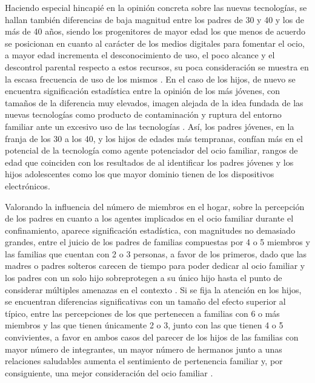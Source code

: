 \documentclass[spanish]{textolivre}
\begin{document}
Haciendo especial hincapié en la opinión concreta sobre las nuevas tecnologías, se hallan también diferencias de baja magnitud entre los padres de 30 y 40 y los de más de 40 años, siendo los progenitores de mayor edad los que menos de acuerdo se posicionan en cuanto al carácter de los medios digitales para fomentar el ocio, a mayor edad incrementa el desconocimiento de uso, el poco alcance y el descontrol parental respecto a estos recursos, su poca consideración se muestra en la escasa frecuencia de uso de los mismos \cite{nikken2015, sanchez-valle2017}. En el caso de los hijos, de nuevo se encuentra significación estadística entre la opinión de los más jóvenes, con tamaños de la diferencia muy elevados, imagen alejada de la idea fundada de las nuevas tecnologías como producto de contaminación y ruptura del entorno familiar ante un excesivo uso de las tecnologías \cite{gamito2019}. Así, los padres jóvenes, en la franja de los 30 a los 40, y los hijos de edades más tempranas, confían más en el potencial de la tecnología como agente potenciador del ocio familiar, rangos de edad que coinciden con los resultados de \textcite{gonzalezfernandez2020} al identificar los padres jóvenes y los hijos adolescentes como los que mayor dominio tienen de los dispositivos electrónicos.

Valorando la influencia del número de miembros en el hogar, sobre la percepción de los padres en cuanto a los agentes implicados en el ocio familiar durante el confinamiento, aparece significación estadística, con magnitudes no demasiado grandes, entre el juicio de los padres de familias compuestas por 4 o 5 miembros y las familias que cuentan con 2 o 3 personas, a favor de los primeros, dado que las madres o padres solteros carecen de tiempo para poder dedicar al ocio familiar y los padres con un solo hijo sobreprotegen a su único hijo hasta el punto de considerar múltiples amenazas en el contexto \cite{townsend2017}. Si se fija la atención en los hijos, se encuentran diferencias significativas con un tamaño del efecto superior al típico, entre las percepciones de los que pertenecen a familias con 6 o más miembros y las que tienen únicamente 2 o 3, junto con las que tienen 4 o 5 convivientes, a favor en ambos casos del parecer de los hijos de las familias con mayor número de integrantes, un mayor número de hermanos junto a unas relaciones saludables aumenta el sentimiento de pertenencia familiar y, por consiguiente, una mejor consideración del ocio familiar \cite{oberg2017}.
\end{document}
